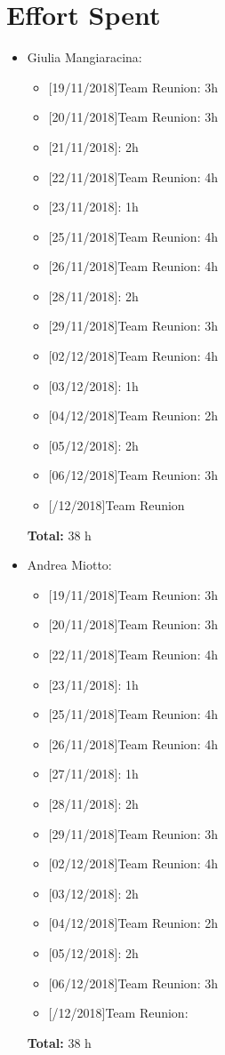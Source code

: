 \chapter{Effort Spent}

\begin{itemize}
\item Giulia Mangiaracina: 
\begin{itemize}
    \item {[}19/11/2018{]}Team Reunion: 3h
    \item {[}20/11/2018{]}Team Reunion: 3h
    \item {[}21/11/2018{]}: 2h
    \item {[}22/11/2018{]}Team Reunion: 4h
    \item {[}23/11/2018{]}: 1h
    \item {[}25/11/2018{]}Team Reunion: 4h
    \item {[}26/11/2018{]}Team Reunion: 4h
    \item {[}28/11/2018{]}: 2h
    \item {[}29/11/2018{]}Team Reunion: 3h
    \item {[}02/12/2018{]}Team Reunion: 4h
    \item {[}03/12/2018{]}: 1h
    \item {[}04/12/2018{]}Team Reunion: 2h
    \item {[}05/12/2018{]}: 2h
    \item {[}06/12/2018{]}Team Reunion: 3h
    \item {[}/12/2018{]}Team Reunion
\end{itemize}
\textbf{Total:} 38 h

\item Andrea Miotto: 
\begin{itemize}
     \item {[}19/11/2018{]}Team Reunion: 3h
    \item {[}20/11/2018{]}Team Reunion: 3h
    \item {[}22/11/2018{]}Team Reunion: 4h
    \item {[}23/11/2018{]}: 1h
    \item {[}25/11/2018{]}Team Reunion: 4h
    \item {[}26/11/2018{]}Team Reunion: 4h
    \item {[}27/11/2018{]}: 1h
    \item {[}28/11/2018{]}: 2h
    \item {[}29/11/2018{]}Team Reunion: 3h
    \item {[}02/12/2018{]}Team Reunion: 4h
    \item {[}03/12/2018{]}: 2h
    \item {[}04/12/2018{]}Team Reunion: 2h
    \item {[}05/12/2018{]}: 2h
    \item {[}06/12/2018{]}Team Reunion: 3h
    \item {[}/12/2018{]}Team Reunion: 
\end{itemize}
\textbf{Total:} 38 h


\end{itemize}
